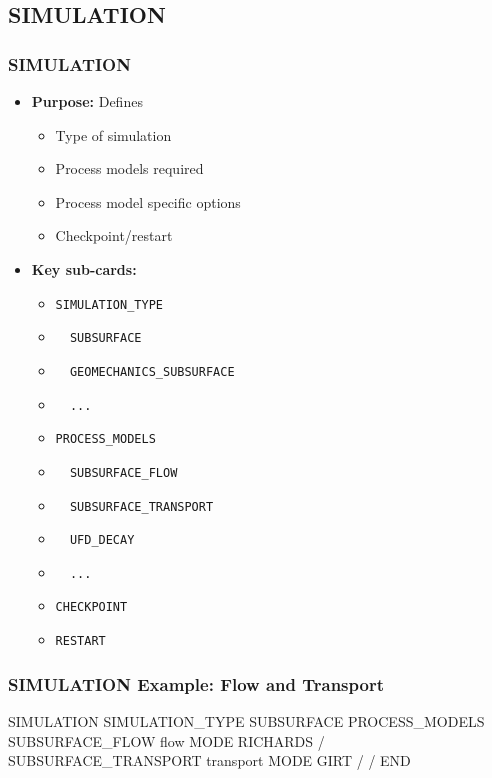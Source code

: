\subsection{SIMULATION}

\begin{frame}\frametitle{SIMULATION}

\begin{itemize}
\item[] \textbf{Purpose:} Defines 
\begin{itemize}
  \item Type of simulation
  \item Process models required
  \item Process model specific options
  \item Checkpoint/restart
\end{itemize}
\begin{comment}
\item[] \textbf{Example uses:}
\begin{itemize}
  \item 
\end{itemize}
\end{comment}
\item[] \textbf{Key sub-cards:}
\begin{itemize}
\item[] \verb|SIMULATION_TYPE|
\item[] \verb|  SUBSURFACE|
\item[] \verb|  GEOMECHANICS_SUBSURFACE|
\item[] \verb|  ...|
\item[] \verb|PROCESS_MODELS|
\item[] \verb|  SUBSURFACE_FLOW|
\item[] \verb|  SUBSURFACE_TRANSPORT|
\item[] \verb|  UFD_DECAY|
\item[] \verb|  ...|
\item[] \verb|CHECKPOINT|
\item[] \verb|RESTART|
\end{itemize}
\end{itemize}

\end{frame}

\begin{frame}[fragile]\frametitle{SIMULATION Example: Flow and Transport}

\begin{semiverbatim}
SIMULATION
  SIMULATION_TYPE SUBSURFACE
  PROCESS_MODELS
    SUBSURFACE_FLOW flow
      MODE RICHARDS
    /
    SUBSURFACE_TRANSPORT transport
      MODE GIRT
    /
  /
END
\end{semiverbatim}

\end{frame}

